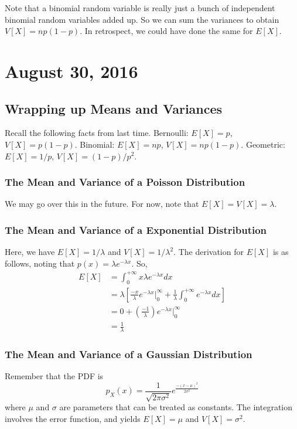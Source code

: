 \documentclass[11pt]{article}
\theoremstyle{definition}
\begin{document}
\noindent Note that a binomial random variable is really just a bunch of independent binomial random variables added up. So we can sum the variances to obtain $V[X] = np(1-p)$. In retrospect, we could have done the same for $E[X]$.

\section{August 30, 2016}

\subsection{Wrapping up Means and Variances} 

Recall the following facts from last time. Bernoulli: $E[X] = p$, $V[X] = p(1-p)$. Binomial: $E[X] = np$, $V[X] = np(1-p)$. Geometric: $E[X] = 1/p$, $V[X] = (1-p)/p^2$. 

\subsubsection{The Mean and Variance of a Poisson Distribution}
We may go over this in the future. For now, note that $E[X] = V[X] = \lambda$. 

\subsubsection{The Mean and Variance of a Exponential Distribution}
Here, we have $E[X] = 1/\lambda$ and $V[X] = 1/\lambda^2$. The derivation for $E[X]$ is as follows, noting that $p(x) = \lambda e^{-\lambda x}$. So,
\begin{align*}
E[X] &= \int_{0}^{+\infty} x \lambda e^{-\lambda x} dx \\
	&= \lambda \left[ \frac{-x}{\lambda} e^{-\lambda x} \bigg|_0^\infty+ \frac{1}{\lambda} \int_0^{+\infty}e^{-\lambda x}dx \right] \\
	&= 0 + \left(\frac{-1}{\lambda} \right)e^{-\lambda x}\bigg|_0^\infty \\
	&= \frac{1}{\lambda}
\end{align*}

\subsubsection{The Mean and Variance of a Gaussian Distribution}
Remember that the PDF is
\begin{equation*}
p_X(x) = \frac{1}{\sqrt{2\pi\sigma^2}}e^{\frac{-(x - \mu)^2}{2\sigma^2}}
\end{equation*}
where $\mu$ and $\sigma$ are parameters that can be treated as constants. The integration involves the error function, and yields $E[X] = \mu$ and $V[X] = \sigma^2$. 
\end{document}
